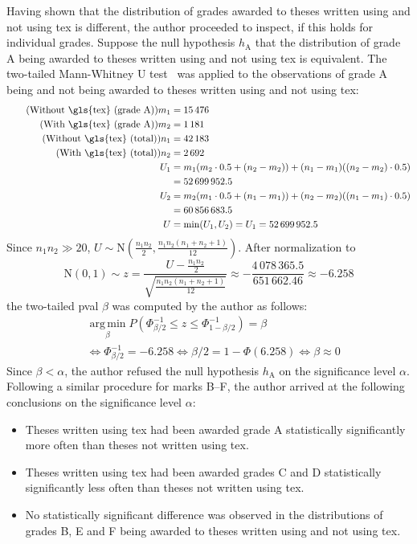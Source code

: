 \documentclass[12pt,twoside,color,table]%
  {fithesis3/fithesis3} %
\begin{document}
  Having shown that the distribution of grades awarded to theses
  written using and not using \gls{tex} is different, the author
  proceeded to inspect, if this holds for individual grades.
  Suppose the null \gls{hypothesis} $h_\text{A}$ that the
  distribution of grade A being awarded to theses written using and
  not using \gls{tex} is equivalent. The two-tailed Mann-Whitney U
  test~\cite{mann47,manntut} was applied to the observations of
  grade A being and not being awarded to theses written using and
  not using \gls{tex}: \begin{align}
    \tag{Without \gls{tex} (grade A)} m_1 &= 15\,476 \\
    \tag{With \gls{tex} (grade A)}    m_2 &= 1\,181  \\
    \tag{Without \gls{tex} (total)} n_1 &= 42\,183 \\
    \tag{With \gls{tex} (total)}    n_2 &= 2\,692  \\
    U_1 &=  m_1(m_2\cdot0.5+(n_2-m_2))+
                  (n_1-m_1)((n_2-m_2)\cdot0.5) \\
      \nonumber&=52\,699\,952.5 \\
    U_2 &=  m_2(m_1\cdot0.5+(n_1-m_1))+
                  (n_2-m_2)((n_1-m_1)\cdot0.5) \\
      \nonumber&=60\,856\,683.5 \\
    U &= \min(U_1,U_2) = U_1 = 52\,699\,952.5
  \end{align} Since $n_1n_2\gg20$,
  $U\sim\text{N}\left(\frac{n_1n_2}2,
  \frac{n_1n_2(n_1+n_2+1)}{12}\right)$. After normalization to
  \begin{equation}
    \text{N}(0,1)\sim z =
    \frac{U-\frac{n_1n_2}2}{\sqrt{\frac{n_1n_2(n_1+n_2+1)}{12}}}
    \approx-\frac{4\,078\,365.5}{651\,662.46}\approx-6.258
  \end{equation} the two-tailed \gls{pval} $\beta$ was computed by
  the author as follows:\begin{align}
    & \operatorname{arg\,min}\limits_{\beta} P(\Phi^{-1}_{\beta/2}
        \leq z\leq\Phi^{-1}_{1-\beta/2})=\beta \\
    \nonumber& \iff\Phi^{-1}_{\beta/2}=-6.258 \iff\beta/2=1-
        \Phi(6.258)\iff\beta\approx 0
  \end{align}Since $\beta<\alpha$, the author refused the null
  \gls{hypothesis} $h_\text{A}$ on the significance level $\alpha$.
  Following a similar procedure for marks B--F, the author arrived
  at the following conclusions on the significance level $\alpha$:
  \begin{itemize}
    \item Theses written using \gls{tex} had been awarded grade A
      statistically significantly more often than theses not
      written using \gls{tex}.
    \item Theses written using \gls{tex} had been awarded grades C
      and D statistically significantly less often than theses not
      written using \gls{tex}.
    \item No statistically significant difference was observed in
      the distributions of grades B, E and F being awarded to
      theses written using and not using \gls{tex}.
  \end{itemize}
\end{document}
